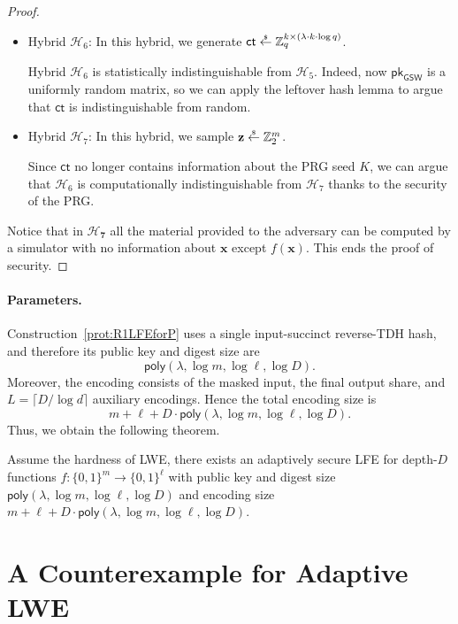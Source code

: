 \documentclass{theoretics}
\newcommand{\getsr}{\overset{\raisebox{-1pt}{$\scriptscriptstyle \$$}}{\gets}}
\newcommand{\sample}{\getsr}
\newcommand{\Z}{\mathbb{Z}}
\newcommand{\poly}{\mathsf{poly}}
\renewcommand{\sec}{\ensuremath{\lambda}}
\newcommand{\ct}{\mathsf{ct}}
\newcommand{\BV}{\mathsf{GSW}}
\newcommand{\pk}{{\mathsf{pk}}}
\begin{document}
\begin{proof}
\begin{itemize}
\item Hybrid ${\mathcal{H}_6}$: In this hybrid, we generate $\ct\sample\Z_q^{k\times (\sec\cdot k\cdot \log q)}$.


Hybrid ${\mathcal{H}_6}$ is statistically indistinguishable from ${\mathcal{H}_5}$. Indeed, now $\pk_\BV$ is a uniformly random matrix, so we can apply the leftover hash lemma to argue that $\ct$ is indistinguishable from random.

\item Hybrid ${\mathcal{H}_7}$: In this hybrid, we sample $\mathbf{z}\sample\Z_2^{m}$.


Since $\ct$ no longer contains information about the PRG seed $K$, we can argue that ${\mathcal{H}_6}$ is computationally indistinguishable from ${\mathcal{H}_7}$ thanks to the security of the PRG.
\end{itemize}

 Notice that in $\mathbf{\mathcal{H}_7}$ all the material provided to the adversary can be computed by a simulator with no information about $\mathbf{x}$ except $f(\mathbf{x})$. This ends the proof of security.
\end{proof}

{\paragraph{Parameters.} Construction~\ref{prot:R1LFEforP}
uses a single input-succinct reverse-TDH hash, and therefore its public key and digest
size are
\[
\poly(\lambda,\log m,\log \ell,\log D).
\]
Moreover, the encoding consists of the masked input, the final output share,
and $L=\lceil D/\log d\rceil$ auxiliary encodings. Hence the total encoding
size is
\[
m+\ell+D\cdot \poly(\lambda,\log m,\log \ell,\log D).
\]
Thus, we obtain the following theorem.}

{
\begin{theorem}
Assume the hardness of LWE, there exists an adaptively secure LFE for
depth-$D$ functions
$f:\{0,1\}^m\to\{0,1\}^\ell$
with public key and digest size $\poly(\lambda,\log m,\log \ell,\log D)$
and encoding size
$m+\ell+D\cdot \poly(\lambda,\log m,\log \ell,\log D)$.
\end{theorem}}
\section{A Counterexample for Adaptive LWE}\label{sec:counter}
\end{document}
